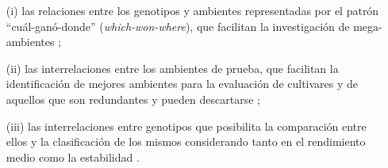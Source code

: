 \begin{itemize}
\item[(i)] las relaciones entre los genotipos y ambientes representadas por el patrón ``cuál-ganó-donde'' (\emph{which-won-where}), que facilitan la investigación de mega-ambientes \citep{GauchZobel1997};

\item[(ii)] las interrelaciones entre los ambientes de prueba, que facilitan la identificación de mejores ambientes para la evaluación de cultivares \citep{Cooperetal1997} y de aquellos que son redundantes y pueden descartarse \citep{YanRajcan2002};

\item[(iii)] las interrelaciones entre genotipos que posibilita la comparación entre ellos y la clasificación de los mismos considerando tanto en el rendimiento medio como la estabilidad \citep{Yanetal2001}.
\end{itemize}


